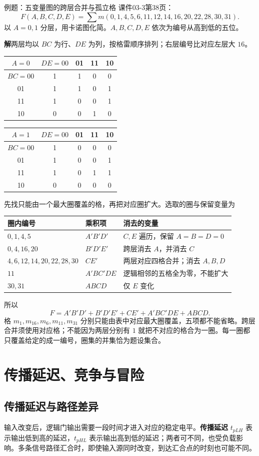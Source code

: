 \documentclass[UTF8,fontset=none,zihao=-4,a4paper]{ctexart}
\newcommand{\chapterpage}[1]{\clearpage\section{#1}}
\newcommand{\term}[1]{\textbf{#1}}
\newcommand{\sol}{\par\noindent\textbf{解}\quad}
\begin{document}
\begin{infobox}{例题：五变量图的跨层合并与孤立格}
课件03-3第38页：
\[
F(A,B,C,D,E)=\sum m(0,1,4,5,6,11,12,14,16,20,22,28,30,31).
\]
以 $A=0,1$ 分层，用卡诺图化简。$A,B,C,D,E$ 依次为编号从高到低的五位。
\end{infobox}
\sol 两层均以 $BC$ 为行、$DE$ 为列，按格雷顺序排列；右层编号比对应左层大 $16$。
\begin{center}
\begin{tabular}{c|cccc}
\toprule $A=0$&$DE=00$&01&11&10\\\midrule
$BC=00$&1&1&0&0\\
01&1&1&0&1\\
11&1&0&0&1\\
10&0&0&1&0\\\bottomrule
\end{tabular}\qquad
\begin{tabular}{c|cccc}
\toprule $A=1$&$DE=00$&01&11&10\\\midrule
$BC=00$&1&0&0&0\\
01&1&0&0&1\\
11&1&0&1&1\\
10&0&0&0&0\\\bottomrule
\end{tabular}
\end{center}
先找只能由一个最大圈覆盖的格，再把对应圈扩大。选取的圈与保留变量为
\begin{center}
\begin{tabularx}{\linewidth}{Y l Y}
\toprule 圈内编号 & 乘积项 & 消去的变量\\\midrule
$0,1,4,5$ & $A'B'D'$ & $C,E$ 遍历，保留 $A=B=D=0$\\
$0,4,16,20$ & $B'D'E'$ & 跨层消去 $A$，并消去 $C$\\
$4,6,12,14,20,22,28,30$ & $CE'$ & 两层对应四格合并；消去 $A,B,D$\\
$11$ & $A'BC'DE$ & 逻辑相邻的五格全为零，不能扩大\\
$30,31$ & $ABCD$ & 仅 $E$ 变化\\\bottomrule
\end{tabularx}
\end{center}
所以
\[
F=A'B'D'+B'D'E'+CE'+A'BC'DE+ABCD.
\]
格 $m_1,m_{16},m_6,m_{11},m_{31}$ 分别只能由表中对应最大圈覆盖，五项都不能省略。跨层合并须使用对应格；不能因为两层分别有 $1$ 就把不对应的格合为一圈。每一圈都只覆盖给定的成一编号，圈集的并集恰为题设集合。


\chapterpage{传播延迟、竞争与冒险}
\subsection{传播延迟与路径差异}
输入改变后，逻辑门输出需要一段时间才进入对应的稳定电平。\term{传播延迟} $t_{pLH}$ 表示输出低到高的延迟，$t_{pHL}$ 表示输出高到低的延迟；两者可不同，也受负载影响。多条信号路径汇合时，即使输入源同时改变，到达汇合点的时刻也可能不同。
\end{document}
